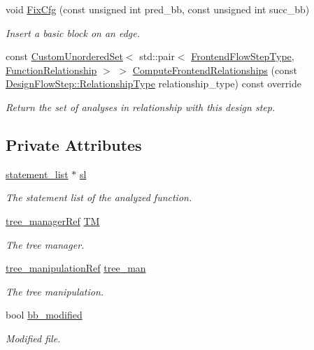 \begin{DoxyCompactItemize}
void \hyperlink{classmulti__way__if_a5d3d9ceeead0ef86f24f33e3bd165c84}{Fix\+Cfg} (const unsigned int pred\+\_\+bb, const unsigned int succ\+\_\+bb)
\begin{DoxyCompactList}\small\item\em Insert a basic block on an edge. \end{DoxyCompactList}\item 
const \hyperlink{classCustomUnorderedSet}{Custom\+Unordered\+Set}$<$ std\+::pair$<$ \hyperlink{frontend__flow__step_8hpp_afeb3716c693d2b2e4ed3e6d04c3b63bb}{Frontend\+Flow\+Step\+Type}, \hyperlink{classFrontendFlowStep_af7cf30f2023e5b99e637dc2058289ab0}{Function\+Relationship} $>$ $>$ \hyperlink{classmulti__way__if_a1c92b27310f15468fe430576a025a94f}{Compute\+Frontend\+Relationships} (const \hyperlink{classDesignFlowStep_a723a3baf19ff2ceb77bc13e099d0b1b7}{Design\+Flow\+Step\+::\+Relationship\+Type} relationship\+\_\+type) const override
\begin{DoxyCompactList}\small\item\em Return the set of analyses in relationship with this design step. \end{DoxyCompactList}\end{DoxyCompactItemize}
\subsection*{Private Attributes}
\begin{DoxyCompactItemize}
\item 
\hyperlink{structstatement__list}{statement\+\_\+list} $\ast$ \hyperlink{classmulti__way__if_ab60cc09060810013c1a138209e85405c}{sl}
\begin{DoxyCompactList}\small\item\em The statement list of the analyzed function. \end{DoxyCompactList}\item 
\hyperlink{tree__manager_8hpp_a96ff150c071ce11a9a7a1e40590f205e}{tree\+\_\+manager\+Ref} \hyperlink{classmulti__way__if_afcac541c14e9f6b9e13c434315673023}{TM}
\begin{DoxyCompactList}\small\item\em The tree manager. \end{DoxyCompactList}\item 
\hyperlink{tree__manipulation_8hpp_a1a9460e3a2f9fc6a96cfd2f24cc9b2a5}{tree\+\_\+manipulation\+Ref} \hyperlink{classmulti__way__if_afa70d2a92fc33d0ad311fc2fb1f0924a}{tree\+\_\+man}
\begin{DoxyCompactList}\small\item\em The tree manipulation. \end{DoxyCompactList}\item 
bool \hyperlink{classmulti__way__if_ad84ba355151bfbd19e9f7e9fe554b5d2}{bb\+\_\+modified}
\begin{DoxyCompactList}\small\item\em Modified file. \end{DoxyCompactList}\end{DoxyCompactItemize}
